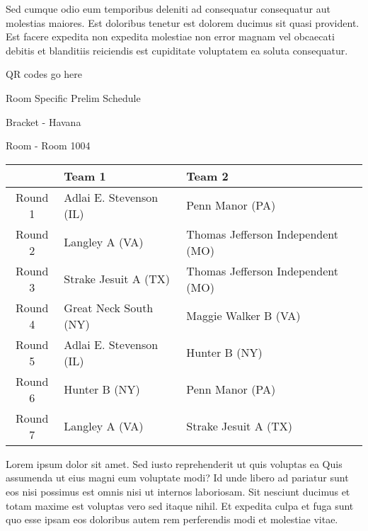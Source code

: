 \documentclass{article}%
\begin{document}
\newline%
Sed cumque odio eum temporibus deleniti ad consequatur consequatur aut molestias maiores. Est doloribus tenetur est dolorem ducimus sit quasi provident. Est facere expedita non expedita molestiae non error magnam vel obcaecati debitis et blanditiis reiciendis est cupiditate voluptatem ea soluta consequatur.%
\vspace*{140pt}%
\begin{center}%
\begin{Huge}%
QR codes go here%
\end{Huge}%
\end{center}%
\newpage%
\begin{center}%
\begin{Huge}%
Room Specific Prelim Schedule%
\end{Huge}%
\vspace*{8pt}%
\linebreak%
\begin{Large}%
Bracket {-} Havana%
\end{Large}%
\vspace*{8pt}%
\linebreak%
\vspace*{8pt}%
\begin{Large}%
Room {-} Room 1004%
\end{Large}%
\end{center}%
%
\begin{tabularx}{\textwidth}{|c|Y|Y|}%
\hline%
&Team 1&Team 2\\%
\hline%
Round 1&Adlai E. Stevenson (IL)&Penn Manor (PA)\\%
Round 2&Langley A (VA)&Thomas Jefferson Independent (MO)\\%
Round 3&Strake Jesuit A (TX)&Thomas Jefferson Independent (MO)\\%
Round 4&Great Neck South (NY)&Maggie Walker B (VA)\\%
Round 5&Adlai E. Stevenson (IL)&Hunter B (NY)\\%
Round 6&Hunter B (NY)&Penn Manor (PA)\\%
Round 7&Langley A (VA)&Strake Jesuit A (TX)\\%
\hline%
\end{tabularx}%
\vspace*{8pt}%
\newline%
Lorem ipsum dolor sit amet. Sed iusto reprehenderit ut quis voluptas ea Quis assumenda ut eius magni eum voluptate modi? Id unde libero ad pariatur sunt eos nisi possimus est omnis nisi ut internos laboriosam. Sit nesciunt ducimus et totam maxime est voluptas vero sed itaque nihil. Et expedita culpa et fuga sunt quo esse ipsam eos doloribus autem rem perferendis modi et molestiae vitae.\newline%
\end{document}
